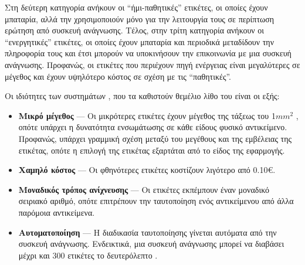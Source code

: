 Στη δεύτερη κατηγορία ανήκουν οι ``ήμι-παθητικές'' ετικέτες, οι οποίες έχουν μπαταρία, αλλά την χρησιμοποιούν μόνο για την λειτουργία τους σε περίπτωση ερώτηση από συσκευή ανάγνωσης.
Τέλος, στην τρίτη κατηγορία ανήκουν οι ``ενεργητικές'' ετικέτες, οι οποίες έχουν μπαταρία και περιοδικά μεταδίδουν την πληροφορία τους και έτσι μπορούν να υποκινήσουν την επικοινωνία με μια συσκευή ανάγνωσης.
Προφανώς, οι ετικέτες που περιέχουν πηγή ενέργειας είναι μεγαλύτερες σε μέγεθος και έχουν υψηλότερο κόστος σε σχέση με τις ``παθητικές''.
\par
Οι ιδιότητες των συστημάτων , που τα καθιστούν θεμέλιο λίθο του  είναι οι εξής:
\begin{itemize}
    \item \textbf{Μικρό μέγεθος} --- Οι μικρότερες ετικέτες  έχουν μέγεθος της τάξεως του 1\(mm^2\) \cite{smalltag}, οπότε υπάρχει η δυνατότητα ενσωμάτωσης σε κάθε είδους φυσικό αντικείμενο.
    Προφανώς, υπάρχει γραμμική σχέση μεταξύ του μεγέθους και της εμβέλειας της ετικέτας, οπότε η επιλογή της ετικέτας εξαρτάται από το είδος της εφαρμογής.
    \item \textbf{Χαμηλό κόστος} --- Οι φθηνότερες ετικέτες  κοστίζουν λιγότερο από 0.10€.
    \item \textbf{Μοναδικός τρόπος ανίχνευσης} --- Οι ετικέτες  εκπέμπουν έναν μοναδικό σειριακό αριθμό, οπότε επιτρέπουν την ταυτοποίηση ενός αντικείμενου από άλλα παρόμοια αντικείμενα.
    \item \textbf{Αυτοματοποίηση} --- Η διαδικασία ταυτοποίησης γίνεται αυτόματα από την συσκευή ανάγνωσης. Ενδεικτικά, μια συσκευή ανάγνωσης μπορεί να διαβάσει μέχρι και 300 ετικέτες το δευτερόλεπτο \cite{rainrfid}.
\end{itemize}

